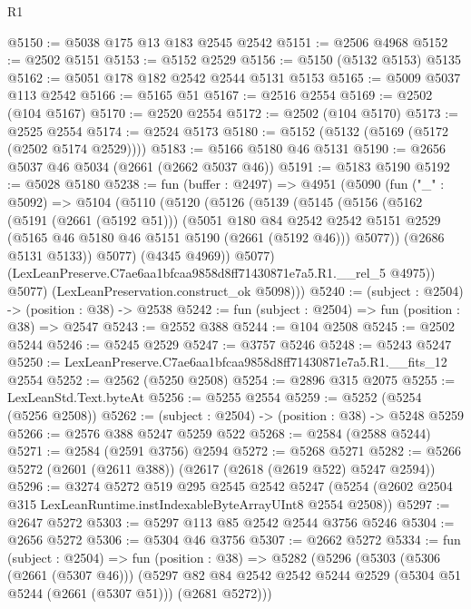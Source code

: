 \begin{lexlean}{R1}
\begin{coremodule}
@5150 := @5038 @175 @13 @183 @2545 @2542
@5151 := @2506 @4968
@5152 := @2502 @5151
@5153 := @5152 @2529
@5156 := @5150 (@5132 @5153) @5135
@5162 := @5051 @178 @182 @2542 @2544 @5131 @5153
@5165 := @5009 @5037 @113 @2542
@5166 := @5165 @51
@5167 := @2516 @2554
@5169 := @2502 (@104 @5167)
@5170 := @2520 @2554
@5172 := @2502 (@104 @5170)
@5173 := @2525 @2554
@5174 := @2524 @5173
@5180 := @5152 (@5132 (@5169 (@5172 (@2502 @5174 @2529))))
@5183 := @5166 @5180 @46 @5131
@5190 := @2656 @5037 @46 @5034 (@2661 (@2662 @5037 @46))
@5191 := @5183 @5190
@5192 := @5028 @5180
@5238 := fun (buffer : @2497) =>
  @4951
    (@5090
      (fun ("_" : @5092) =>
      @5104
        (@5110
          (@5120
            (@5126
              (@5139
                (@5145
                  (@5156
                    (@5162
                      (@5191 (@2661 (@5192 @51)))
                      (@5051
                        @180
                        @84
                        @2542
                        @2542
                        @5151
                        @2529
                        (@5165 @46 @5180 @46 @5151 @5190 (@2661 (@5192 @46)))
                        @5077))
                    (@2686 @5131 @5133))
                  @5077)
                (@4345 @4969))
              @5077)
            (LexLeanPreserve.C7ae6aa1bfcaa9858d8ff71430871e7a5.R1.__rel_5 @4975))
          @5077)
        (LexLeanPreservation.construct_ok @5098)))
@5240 := (subject : @2504) -> (position : @38) -> @2538
@5242 := fun (subject : @2504) => fun (position : @38) => @2547
@5243 := @2552 @388
@5244 := @104 @2508
@5245 := @2502 @5244
@5246 := @5245 @2529
@5247 := @3757 @5246
@5248 := @5243 @5247
@5250 := LexLeanPreserve.C7ae6aa1bfcaa9858d8ff71430871e7a5.R1.__fits_12 @2554
@5252 := @2562 (@5250 @2508)
@5254 := @2896 @315 @2075
@5255 := LexLeanStd.Text.byteAt
@5256 := @5255 @2554
@5259 := @5252 (@5254 (@5256 @2508))
@5262 := (subject : @2504) -> (position : @38) -> @5248 @5259
@5266 := @2576 @388 @5247 @5259 @522
@5268 := @2584 (@2588 @5244)
@5271 := @2584 (@2591 @3756) @2594
@5272 := @5268 @5271
@5282 := @5266 @5272 (@2601 (@2611 @388)) (@2617 (@2618 (@2619 @522) @5247 @2594))
@5296 := @3274
    @5272
    @519
    @295
    @2545
    @2542
    @5247
    (@5254 (@2602 @2504 @315 LexLeanRuntime.instIndexableByteArrayUInt8 @2554 @2508))
@5297 := @2647 @5272
@5303 := @5297 @113 @85 @2542 @2544 @3756 @5246
@5304 := @2656 @5272
@5306 := @5304 @46 @3756
@5307 := @2662 @5272
@5334 := fun (subject : @2504) =>
  fun (position : @38) =>
  @5282
    (@5296
      (@5303
        (@5306 (@2661 (@5307 @46)))
        (@5297 @82 @84 @2542 @2542 @5244 @2529 (@5304 @51 @5244 (@2661 (@5307 @51))) (@2681 @5272)))

\end{coremodule}
\end{lexlean}
